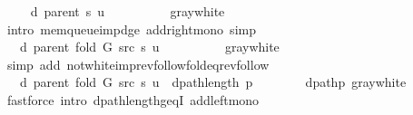 \begin{isabellebody}
\ \isamarkupfalse%
\ {\isachardoublequoteopen}{\isachardot}{\kern0pt}{\isachardot}{\kern0pt}{\isachardot}{\kern0pt}\ {\isasymle}\ d\ {\isacharparenleft}{\kern0pt}parent\ s{\isacharparenright}{\kern0pt}\ u\ {\isacharplus}{\kern0pt}\ {}{\isachardoublequoteclose}\isanewline
\ \ \ \ \ \ \isamarkupfalse%
\ gray{\isacharunderscore}{\kern0pt}white\isanewline
\ \ \ \ \ \ \isamarkupfalse%
\ {\isacharparenleft}{\kern0pt}intro\ mem{\isacharunderscore}{\kern0pt}queue{\isacharunderscore}{\kern0pt}imp{\isacharunderscore}{\kern0pt}d{\isacharunderscore}{\kern0pt}ge\ add{\isacharunderscore}{\kern0pt}right{\isacharunderscore}{\kern0pt}mono{\isacharparenright}{\kern0pt}\ simp\isanewline
\ \ \ \ \isamarkupfalse%
\ \isamarkupfalse%
\ {\isachardoublequoteopen}{\isachardot}{\kern0pt}{\isachardot}{\kern0pt}{\isachardot}{\kern0pt}\ {\isacharequal}{\kern0pt}\ d\ {\isacharparenleft}{\kern0pt}parent\ {\isacharparenleft}{\kern0pt}fold\ G\ src\ s{\isacharparenright}{\kern0pt}{\isacharparenright}{\kern0pt}\ u\ {\isacharplus}{\kern0pt}\ {}{\isachardoublequoteclose}\isanewline
\ \ \ \ \ \ \isamarkupfalse%
\ gray{\isacharunderscore}{\kern0pt}white\isanewline
\ \ \ \ \ \ \isamarkupfalse%
\ {\isacharparenleft}{\kern0pt}simp\ add{\isacharcolon}{\kern0pt}\ not{\isacharunderscore}{\kern0pt}white{\isacharunderscore}{\kern0pt}imp{\isacharunderscore}{\kern0pt}rev{\isacharunderscore}{\kern0pt}follow{\isacharunderscore}{\kern0pt}fold{\isacharunderscore}{\kern0pt}eq{\isacharunderscore}{\kern0pt}rev{\isacharunderscore}{\kern0pt}follow{\isacharparenright}{\kern0pt}\isanewline
\ \ \ \ \isamarkupfalse%
\ \isamarkupfalse%
\ {\isachardoublequoteopen}{\isachardot}{\kern0pt}{\isachardot}{\kern0pt}{\isachardot}{\kern0pt}\ {\isasymle}\ d\ {\isacharparenleft}{\kern0pt}parent\ {\isacharparenleft}{\kern0pt}fold\ G\ src\ s{\isacharparenright}{\kern0pt}{\isacharparenright}{\kern0pt}\ u\ {\isacharplus}{\kern0pt}\ dpath{\isacharunderscore}{\kern0pt}length\ p{\isachardoublequoteclose}\isanewline
\ \ \ \ \ \ \isamarkupfalse%
\ dpath{\isacharunderscore}{\kern0pt}p\ gray{\isacharunderscore}{\kern0pt}white\isanewline
\ \ \ \ \ \ \isamarkupfalse%
\ {\isacharparenleft}{\kern0pt}fastforce\ intro{\isacharcolon}{\kern0pt}\ dpath{\isacharunderscore}{\kern0pt}length{\isacharunderscore}{\kern0pt}geq{\isacharunderscore}{\kern0pt}{}I\ add{\isacharunderscore}{\kern0pt}left{\isacharunderscore}{\kern0pt}mono{\isacharparenright}{\kern0pt}\isanewline

\end{isabellebody}
